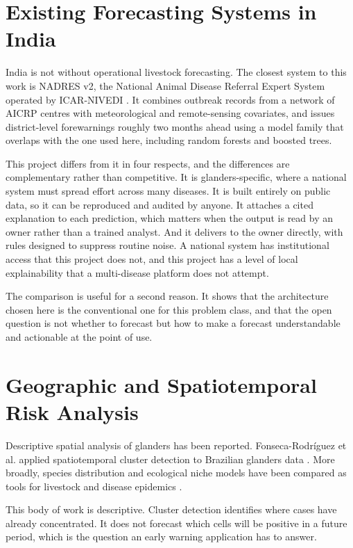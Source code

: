 \documentclass[10pt,openany]{report}
\begin{document}
\section{Existing Forecasting Systems in India}

India is not without operational livestock forecasting. The closest system to this work is
NADRES v2, the National Animal Disease Referral Expert System operated by ICAR-NIVEDI
\cite{nadres}. It combines outbreak records from a network of AICRP centres with meteorological
and remote-sensing covariates, and issues district-level forewarnings roughly two months ahead
using a model family that overlaps with the one used here, including random forests and boosted
trees.

This project differs from it in four respects, and the differences are complementary rather than
competitive. It is glanders-specific, where a national system must spread effort across many
diseases. It is built entirely on public data, so it can be reproduced and audited by anyone. It
attaches a cited explanation to each prediction, which matters when the output is read by an owner
rather than a trained analyst. And it delivers to the owner directly, with rules designed to
suppress routine noise. A national system has institutional access that this project does not, and
this project has a level of local explainability that a multi-disease platform does not attempt.

The comparison is useful for a second reason. It shows that the architecture chosen here is the
conventional one for this problem class, and that the open question is not whether to forecast but
how to make a forecast understandable and actionable at the point of use.

\section{Geographic and Spatiotemporal Risk Analysis}

Descriptive spatial analysis of glanders has been reported. Fonseca-Rodr\'iguez et al. applied
spatiotemporal cluster detection to Brazilian glanders data \cite{fonseca2019}. More broadly,
species distribution and ecological niche models have been compared as tools for livestock and
disease epidemics \cite{hollings2017}.

This body of work is descriptive. Cluster detection identifies where cases have already
concentrated. It does not forecast which cells will be positive in a future period, which is the
question an early warning application has to answer.
\end{document}
